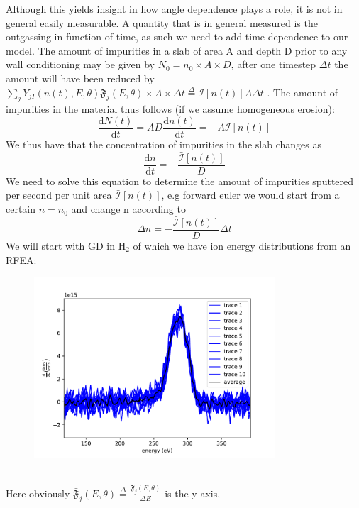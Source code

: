 \documentclass{article}
\begin{document}
Although this yields insight in how angle dependence plays a role, it is not in general easily measurable.
A quantity that is in general measured is the outgassing in function of time, as such we need to add time-dependence
to our model.
The amount of impurities in a slab of area A and depth D prior to any 
wall conditioning may be given by
$N_0 = n_0\times A \times D$, after one timestep $\Delta t$ the amount will have been reduced
by $\sum_jY_{jI}(n(t),E,\theta)\mathfrak{F}_j(E,\theta)\times A\times\Delta t\stackrel{\Delta}{=}\mathcal{I}[n(t)]A\Delta t $ .
The amount of impurities in the material thus follows (if we assume homogeneous erosion):
\begin{equation}
    \frac{\text{d}N(t)}{\text{d}t} = AD\frac{\text{d}n(t)}{\text{d}t} = -A\mathcal{I}[n(t)]
\end{equation}
We thus have that the concentration of impurities in the slab changes as 
\begin{equation}
    \frac{\text{d} n}{\text{d} t} = -\frac{\bar{\mathcal{I}}[n(t)]}{D}
\end{equation}
We need to solve this equation to determine the amount of impurities sputtered per second per unit area
$\bar{\mathcal{I}}[n(t)]$, e.g forward euler we would start from a certain $n = n_0$ and change n according
to
\begin{equation}
    \Delta n = -\frac{\bar{\mathcal{I}}[n(t)]}{D}\Delta t
\end{equation}
We will start with GD in H$_2$ of which we have ion energy distributions from an RFEA:
\begin{figure}[ht]
    \centering
    \includegraphics[width=0.8\textwidth]{figures/RFEAex.pdf}
\end{figure}\\
Here obviously $\bar{\mathfrak{F}}_j(E,\theta) \stackrel{\Delta}{=} \frac{\mathfrak{F}_j(E,\theta)}{\Delta E}$ is the y-axis,
\end{document}
